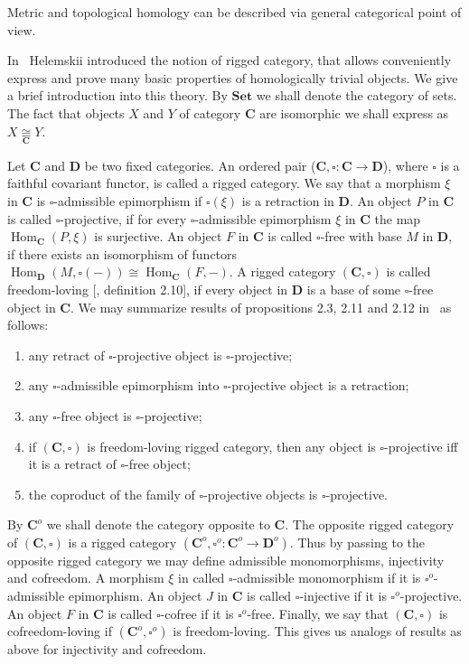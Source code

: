 \documentclass[12pt]{article}
\newcommand{\isom}[1]{\mathop{\mathbin{\cong}}\limits_{#1}}
\begin{document}
Metric and topological homology can be described via general categorical point
of view.

In~\cite{HelMetrFrQMod} Helemskii introduced the notion of rigged category, that
allows conveniently express and prove many basic properties of homologically
trivial objects. We give a brief introduction into this theory. By
$\mathbf{Set}$ we shall denote the category of sets. The fact that objects $X$
and $Y$ of category $\mathbf{C}$ are isomorphic we shall express as
$X\isom{\mathbf{C}}Y$.

Let $\mathbf{C}$ and $\mathbf{D}$ be two fixed categories. An ordered pair
($\mathbf{C}, \square:\mathbf{C}\to\mathbf{D}$), where $\square$ is a faithful
covariant functor, is called a rigged category. We say that a morphism $\xi$ in
$\mathbf{C}$ is $\square$-admissible epimorphism if $\square (\xi)$ is a
retraction in $\mathbf{D}$. An object $P$ in $\mathbf{C}$ is called
$\square$-projective, if for every $\square$-admissible epimorphism $\xi$ in
$\mathbf{C}$ the map $\operatorname{Hom}_{\mathbf{C}}(P,\xi)$ is surjective. An
object $F$ in $\mathbf{C}$ is called $\square$-free with base $M$ in
$\mathbf{D}$, if there exists an isomorphism of functors
$\operatorname{Hom}_{\mathbf{D}}(M,\square(-))\cong 
    \operatorname{Hom}_{\mathbf{C}}(F,-)$. 
A rigged category $(\mathbf{C},\square)$
is called  freedom-loving [\cite{HelMetrFrQMod}, definition 2.10], if every
object in $\mathbf{D}$ is a base of some $\square$-free object in $\mathbf{C}$.
We may summarize results of propositions 2.3, 2.11  and 2.12
in~\cite{HelMetrFrQMod} as follows:
\begin{enumerate}[label = (\roman*)]
    \item any retract of $\square$-projective object is $\square$-projective;
    \item any $\square$-admissible epimorphism into $\square$-projective object
          is a retraction;
    \item any $\square$-free object is $\square$-projective;
    \item if $(\mathbf{C},\square)$ is freedom-loving rigged category, then any
          object is $\square$-projective iff it is a retract of $\square$-free
          object;
    \item the coproduct of the family of $\square$-projective objects is
          $\square$-projective.
\end{enumerate}

By $\mathbf{C}^{o}$ we shall denote the category opposite to $\mathbf{C}$. The
opposite rigged category of $(\mathbf{C}, \square)$ is a rigged category
$(\mathbf{C}^{o},\square^{o}:\mathbf{C}^{o}\to\mathbf{D}^{o})$. Thus by passing
to the opposite rigged category we may define admissible monomorphisms,
injectivity and cofreedom. A morphism $\xi$ in called $\square$-admissible
monomorphism if it is $\square^o$-admissible epimorphism. An object $J$ in
$\mathbf{C}$ is called $\square$-injective if it is $\square^o$-projective. An
object $F$ in $\mathbf{C}$ is called $\square$-cofree if it is $\square^o$-free.
Finally, we say that $(\mathbf{C}, \square)$ is cofreedom-loving if
$(\mathbf{C}^{o}, \square^{o})$ is freedom-loving. This gives us analogs of
results as above for injectivity and cofreedom.
\end{document}
